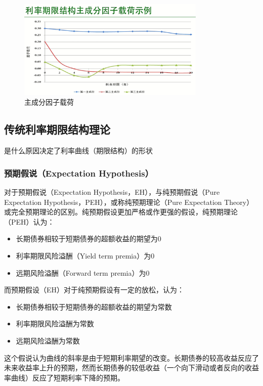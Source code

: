 \documentclass[11pt]{article}
\begin{document}
\begin{figure}[H]
    \centering
    \includegraphics[width=0.8\textwidth]{fig/factor-loading.png}
	\caption{主成分因子载荷}
    \label{fig:factor-loading}
\end{figure}

\subsection{传统利率期限结构理论}

是什么原因决定了利率曲线（期限结构）的形状

\subsubsection{预期假说（Expectation Hypothesis）}

对于预期假说（Expectation Hypothesis，EH），与纯预期假说（Pure Expectation Hypothesis，PEH），或称纯预期理论（Pure Expectation Theory）或完全预期理论的区别。纯预期假设更加严格或作更强的假设，纯预期理论（PEH）认为：
\begin{itemize}
    \item 长期债券相较于短期债券的超额收益的期望为0
    \item 利率期限风险溢酬（Yield term premia）为0
    \item 远期风险溢酬（Forward term premia）为0
\end{itemize}

而预期假设（EH）对于纯预期假设有一定的放松，认为：
\begin{itemize}
    \item 长期债券相较于短期债券的超额收益的期望为常数
    \item 利率期限风险溢酬为常数
    \item 远期风险溢酬为常数
\end{itemize}

这个假说认为曲线的斜率是由于短期利率期望的改变。长期债券的较高收益反应了未来收益率上升的预期，然而长期债券的较低收益（一个向下滑动或者反向的收益率曲线）反应了短期利率下降的预期。
\end{document}
